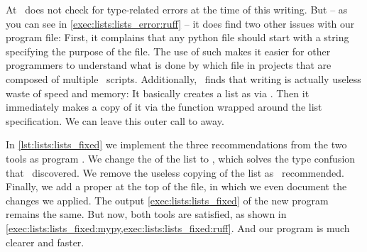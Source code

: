 At \ruff\ does not check for type-related errors at the time of this writing.
But -- as you can see in \cref{exec:lists:lists_error:ruff} -- it does find two other issues with our program file:
First, it complains that any python file should start with a string specifying the purpose of the file.
The use of such  makes it easier for other programmers to understand what is done by which file in projects that are composed of multiple \python\ scripts.%
%
%
%
Additionally, \ruff\ finds that writing  is actually useless waste of speed and memory:
It basically creates a list as  via \pythonil{[1, 2, 3]}.
Then it immediately makes a copy of it via the  function wrapped around the list specification.
We can leave this outer call to  away.

%
%
%
%
In \cref{lst:lists:lists_fixed} we implement the three recommendations from the two tools as program .
We change the  of the list to , which solves the type confusion that \mypy\ discovered.
We remove the useless copying of the list as \ruff\ recommended.
Finally, we add a proper  at the top of the file, in which we even document the changes we applied.
The output \cref{exec:lists:lists_fixed} of the new program remains the same.
But now, both tools are satisfied, as shown in \cref{exec:lists:lists_fixed:mypy,exec:lists:lists_fixed:ruff}.
And our program is much clearer and faster.

%
%
%
%

